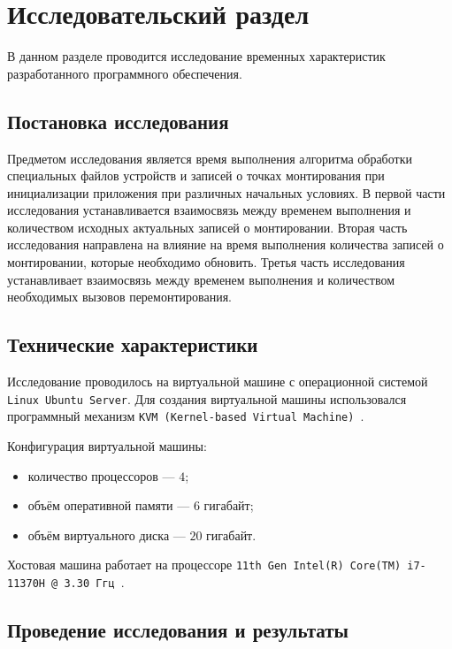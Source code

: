 \chapter{Исследовательский раздел}

В данном разделе проводится исследование временных характеристик
разработанного программного обеспечения.

\section{Постановка исследования}

Предметом исследования является время выполнения алгоритма обработки 
специальных файлов устройств и записей о точках монтирования при инициализации приложения 
при различных начальных условиях. В первой части исследования устанавливается взаимосвязь
между временем выполнения и количеством исходных актуальных записей о монтировании.
Вторая часть исследования направлена на влияние на время выполнения количества записей о 
монтировании, которые необходимо обновить. Третья часть исследования устанавливает
взаимосвязь между временем выполнения и количеством необходимых вызовов перемонтирования.

\section{Технические характеристики}

Исследование проводилось на виртуальной машине с операционной системой \texttt{Linux Ubuntu Server}.
Для создания виртуальной машины использовался программный механизм \texttt{KVM (Kernel-based Virtual Machine)}~\cite{KVM}.

Конфигурация виртуальной машины:

\begin{itemize}[label=---]
    \item количество процессоров --- $4$;
    \item объём оперативной памяти --- $6$ гигабайт;
    \item объём виртуального диска --- $20$ гигабайт.
\end{itemize}

Хостовая машина работает на процессоре \texttt{11th Gen Intel(R) Core(TM) i7-11370H @ 3.30 Ггц}~\cite{Intel}.

\section{Проведение исследования и результаты}

